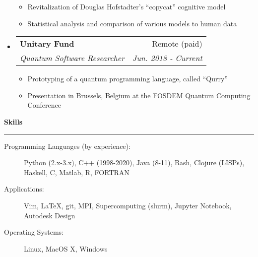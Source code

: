 \documentclass[letterpaper,11pt]{article}
\makeatletter
\newcommand{\sectionline}{
    \noindent\rule[0.5ex]{\linewidth}{0.5pt}
}
\newcommand{\resitem}[1]{\item #1 \vspace{-3pt}}
\newcommand{\resheading}[1]{
    {\large \textbf{#1}}
    \sectionline
}
\newcommand{\colfill}{@{\extracolsep{\fill}}}
\newcommand{\ressubheading}[4]{
\begin{tabular*}{6.5in}{l\colfill r}
		\textbf{#1} & #2 \\
		\textit{#3} & \textit{#4} \\
\end{tabular*}\vspace{-6pt}}
\makeatother
\begin{document}
\begin{itemize}
 	\begin{itemize}
 		\resitem{Revitalization of Douglas Hofstadter's ``copycat'' cognitive model}
 		\resitem{Statistical analysis and comparison of various models to human data}
 	\end{itemize}
 \item
     \ressubheading{Unitary Fund}{Remote (paid)}{Quantum Software Researcher}{Jun. 2018 - Current}
 	\begin{itemize}
            \resitem{Prototyping of a quantum programming language, called ``Qurry''}
            \resitem{Presentation in Brussels, Belgium at the FOSDEM Quantum Computing Conference}
 	\end{itemize}
\end{itemize}

\resheading{Skills}
\begin{description}
    \item[Programming Languages (by experience):] 
        Python (2.x-3.x), C++ (1998-2020), Java (8-11), Bash, Clojure (LISPs), Haskell, C, Matlab, R, FORTRAN
    \item[Applications:]
        Vim, \LaTeX, git, MPI, Supercomputing (slurm), Jupyter Notebook, Autodesk Design 
    \item[Operating Systems:]
        Linux, MacOS X, Windows

\end{description}
\end{document}
